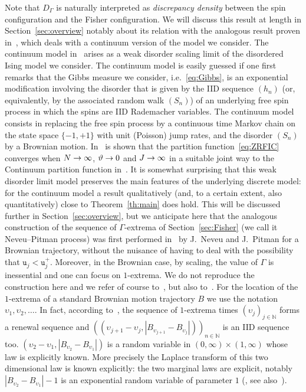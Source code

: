 \documentclass[10pt]{amsart}
\theoremstyle{definition}\newtheorem{defi}[theo]{Definition}\newtheorem{rema}[theo]{Remark}\newtheorem{exam}[theo]{Example}\newtheorem{exem}[theo]{Example}\newtheorem{nota}[theo]{Notation}
\newcommand{\bbN}{\mathbb{N}}
\newcommand{\gG}{\Gamma}
\renewcommand*\ss{\mathtt{u}}
\newcommand{\tu}{\ss}
\renewcommand*{\to}{\mathchoice{\longrightarrow}{\rightarrow}{\rightarrow}{\rightarrow}}
\begin{document}
Note that $D_\gG$ is naturally interpreted as \emph{discrepancy density} between the spin configuration and the Fisher configuration. We will discuss this result at length in Section~\ref{sec:overview} notably about its relation with the analogous result proven in~\cite{cf:CGH1}, which deals with a continuum version of the model we consider. The continuum model in~\cite{cf:CGH1} arises as a weak disorder scaling limit of the disordered Ising model we consider. {The continuum model is easily guessed if one first remarks that the Gibbs measure we consider, i.e.~\eqref{eq:Gibbs}, is an exponential modification involving the disorder that is given by the IID sequence $(h_n)$ (or, equivalently, by the associated random walk $(S_n)$) of an underlying free spin process in which the spins are IID Rademacher variables. The continuum model consists in replacing the free spin process by a continuous time Markov chain on the state space $\{-1,+1\}$ with unit (Poisson) jump rates, and the disorder $(S_n)$ by a Brownian motion.} In~\cite[Appendix~C]{cf:CGH1} is shown that the partition function~\eqref{eq:ZRFIC} converges when $N\to \infty$, $\vartheta\to 0$ and $J \to \infty$ in a suitable joint way to the Continuum partition function in~\cite{cf:CGH1}. It is somewhat surprising that this weak disorder limit model preserves the main features of the underlying discrete model: for the continuum model a result qualitatively (and, to a certain extent, also quantitatively) close to Theorem~\ref{th:main} does hold. This will be discussed further in Section~\ref{sec:overview}, but we anticipate here that the analogous construction of the sequence of $\gG$-extrema of Section~\ref{sec:Fisher} (we call it Neveu--Pitman process) was first performed in~\cite{cf:NP89} by J.~Neveu and J.~Pitman for a Brownian trajectory, without the nuisance of having to deal with the possibility that $\tu_j< \tu_j^+$. Moreover, in the Brownian case, by scaling, the value of $\gG$ is inessential and one can focus on $1$-extrema. We do not reproduce the construction here and we refer of course to~\cite{cf:NP89}, but also to~\cite{cf:BF08,cf:Cheliotis,cf:CGH1}. For the location of the $1$-extrema of a standard Brownian motion trajectory $B$ we use the notation $\upsilon_1, \upsilon_2, \dots$. In fact, according to~\cite{cf:NP89}, the sequence of $1$-extrema times $(\upsilon_j)_{j \in \bbN}$ forms a renewal sequence and $((\upsilon_{j+1}-\upsilon_j, |B_{\upsilon_{j+1}}-B_{\upsilon_{j}}|))_{n\in \bbN}$ is an IID sequence too. $(\upsilon_{2}-\upsilon_1, |B_{\upsilon_{2}}-B_{\upsilon_{1}}|)$ is a random variable in $(0, \infty)\times (1, \infty)$ whose law is explicitly known. More precisely the Laplace transform of this two dimensional law is known explicitly: the two marginal laws are explicit, notably $ | B_{\upsilon_{2}}-B_{\upsilon_{1}}|-1$ is an exponential random variable of parameter $1$ (\cite{cf:NP89}, see also~\cite{cf:FLDM01}).
\end{document}
